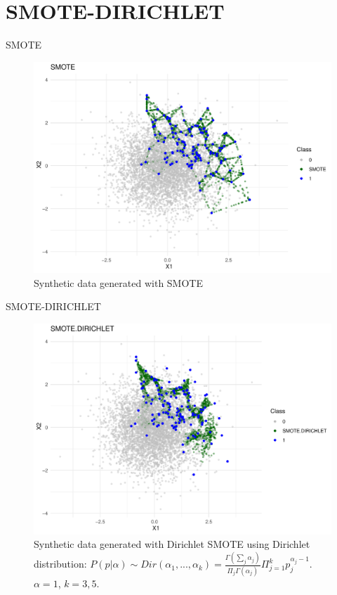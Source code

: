 \documentclass{beamer}
\begin{document}



\section{SMOTE-DIRICHLET}
\begin{frame}{SMOTE}
  \begin{figure}
      \centering
      \includegraphics[width=0.75\linewidth]{images/smote.pdf}
      \caption{Synthetic data generated with SMOTE}
      \label{fig:label1}
  \end{figure}
\end{frame}

\begin{frame}{SMOTE-DIRICHLET}
  \begin{figure}
      \centering
      \includegraphics[width=0.7\linewidth]{images/dirichlet.pdf}
      \caption{Synthetic data generated with Dirichlet SMOTE using Dirichlet distribution: $P(p|\alpha) \sim Dir(\alpha_1, ... , \alpha_k) = \frac{\Gamma(\sum_j \alpha_j )}{\Pi_j \Gamma(\alpha_j)} \Pi_{j = 1}^{k} p_j^{\alpha_j -1}$. $\alpha = 1$, $k = 3,5$. \cite{matharaarachchi2024enhancing}}
      \label{fig:label2}
  \end{figure}    
\end{frame}
\end{document}

